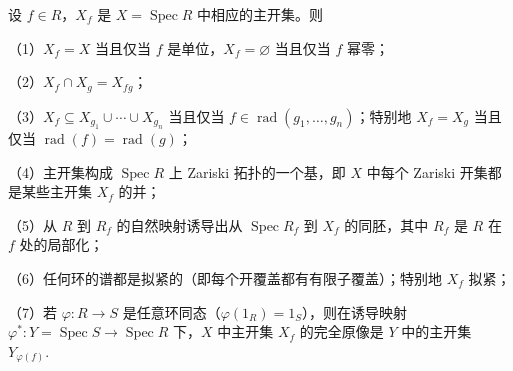 \begin{proposition}\label{pro:15.56}
设 \(f \in R\)，\(X_f\) 是 \(X = \operatorname{Spec}R\) 中相应的主开集。则

（1）\(X_f = X\) 当且仅当 \(f\) 是单位，\(X_f = \varnothing\) 当且仅当 \(f\) 幂零；

（2）\(X_f \cap X_g = X_{fg}\)；

（3）\(X_f \subseteq X_{g_1} \cup \cdots \cup X_{g_n}\) 当且仅当 \(f \in \operatorname{rad}(g_1, \ldots, g_n)\)；特别地 \(X_f = X_g\) 当且仅当 \(\operatorname{rad}(f) = \operatorname{rad}(g)\)；

（4）主开集构成 \(\operatorname{Spec}R\) 上 Zariski 拓扑的一个基，即 \(X\) 中每个 Zariski 开集都是某些主开集 \(X_f\) 的并；

（5）从 \(R\) 到 \(R_f\) 的自然映射诱导出从 \(\operatorname{Spec}R_f\) 到 \(X_f\) 的同胚，其中 \(R_f\) 是 \(R\) 在 \(f\) 处的局部化；

（6）任何环的谱都是拟紧的（即每个开覆盖都有有限子覆盖）；特别地 \(X_f\) 拟紧；

（7）若 \(\varphi : R \to S\) 是任意环同态（\(\varphi(1_R) = 1_S\)），则在诱导映射 \(\varphi^* : Y = \operatorname{Spec}S \to \operatorname{Spec}R\) 下，\(X\) 中主开集 \(X_f\) 的完全原像是 \(Y\) 中的主开集 \(Y_{\varphi(f)}\).
\end{proposition}

